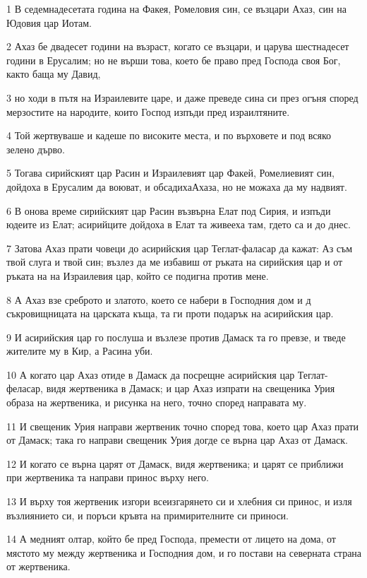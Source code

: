\par 1 В седемнадесетата година на Факея, Ромеловия син, се възцари Ахаз, син на Юдовия цар Иотам.
\par 2 Ахаз бе двадесет години на възраст, когато се възцари, и царува шестнадесет години в Ерусалим; но не върши това, което бе право пред Господа своя Бог, както баща му Давид,
\par 3 но ходи в пътя на Израилевите царе, и даже преведе сина си през огъня според мерзостите на народите, които Господ изпъди пред израилтяните.
\par 4 Той жертвуваше и кадеше по високите места, и по върховете и под всяко зелено дърво.
\par 5 Тогава сирийският цар Расин и Израилевият цар Факей, Ромелиевият син, дойдоха в Ерусалим да воюват, и обсадихаАхаза, но не можаха да му надвият.
\par 6 В онова време сирийският цар Расин възвърна Елат под Сирия, и изпъди юдеите из Елат; асирийците дойдоха в Елат та живееха там, гдето са и до днес.
\par 7 Затова Ахаз прати човеци до асирийския цар Теглат-фаласар да кажат: Аз съм твой слуга и твой син; възлез да ме избавиш от ръката на сирийския цар и от ръката на на Израилевия цар, който се подигна против мене.
\par 8 А Ахаз взе среброто и златото, което се набери в Господния дом и д съкровищницата на царската къща, та ги проти подарък на асирийския цар.
\par 9 И асирийския цар го послуша и възлезе против Дамаск та го превзе, и тведе жителите му в Кир, а Расина уби.
\par 10 А когато цар Ахаз отиде в Дамаск да посрещне асирийския цар Теглат-феласар, видя жертвеника в Дамаск; и цар Ахаз изпрати на свещеника Урия образа на жертвеника, и рисунка на него, точно според направата му.
\par 11 И свещеник Урия направи жертвеник точно според това, което цар Ахаз прати от Дамаск; така го направи свещеник Урия догде се върна цар Ахаз от Дамаск.
\par 12 И когато се върна царят от Дамаск, видя жертвеника; и царят се приближи при жертвеника та направи принос върху него.
\par 13 И върху тоя жертвеник изгори всеизгарянето си и хлебния си принос, и изля възлиянието си, и поръси кръвта на примирителните си приноси.
\par 14 А медният олтар, който бе пред Господа, премести от лицето на дома, от мястото му между жертвеника и Господния дом, и го постави на северната страна от жертвеника.
